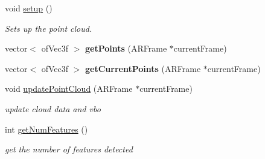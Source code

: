 \begin{DoxyCompactItemize}
\item 
\mbox{\label{class_a_r_debug_utils_1_1_point_cloud_debug_a04e1ac43f026e32bb5b4877d41d69528}} 
void \hyperlink{class_a_r_debug_utils_1_1_point_cloud_debug_a04e1ac43f026e32bb5b4877d41d69528}{setup} ()
\begin{DoxyCompactList}\small\item\em Sets up the point cloud. \end{DoxyCompactList}\item 
\mbox{\label{class_a_r_debug_utils_1_1_point_cloud_debug_abf68c97daba914eb42e084234ca4c980}} 
vector$<$ of\+Vec3f $>$ {\bfseries get\+Points} (A\+R\+Frame $\ast$current\+Frame)
\item 
\mbox{\label{class_a_r_debug_utils_1_1_point_cloud_debug_a62e8829bd3cdcc822fda0962e1abcac9}} 
vector$<$ of\+Vec3f $>$ {\bfseries get\+Current\+Points} (A\+R\+Frame $\ast$current\+Frame)
\item 
\mbox{\label{class_a_r_debug_utils_1_1_point_cloud_debug_a02a8d4c24ec4b19c238288874a568a9f}} 
void \hyperlink{class_a_r_debug_utils_1_1_point_cloud_debug_a02a8d4c24ec4b19c238288874a568a9f}{update\+Point\+Cloud} (A\+R\+Frame $\ast$current\+Frame)
\begin{DoxyCompactList}\small\item\em update cloud data and vbo \end{DoxyCompactList}\item 
\mbox{\label{class_a_r_debug_utils_1_1_point_cloud_debug_a0757ac82a88433c519ec6362ac8cd251}} 
int \hyperlink{class_a_r_debug_utils_1_1_point_cloud_debug_a0757ac82a88433c519ec6362ac8cd251}{get\+Num\+Features} ()
\begin{DoxyCompactList}\small\item\em get the number of features detected \end{DoxyCompactList}\item 
\mbox{\label{class_a_r_debug_utils_1_1_point_cloud_debug_abfaa58360f92ad1b41692175107c99a8}} 

\end{DoxyCompactItemize}

